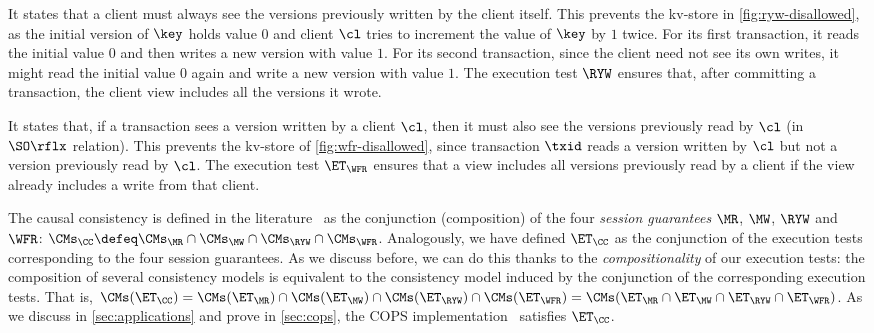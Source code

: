 It states that a client must always see the versions previously written by the client itself.
This prevents the kv-store in \cref{fig:ryw-disallowed}, 
as the initial version of $\key$ holds value $0$ 
and client $\cl$ tries to increment the value of $\key$ by $1$ twice.  
For its first transaction, it reads the initial value $0$ and then writes a new version with value $1$. 
For its second transaction, since the client need not see its own writes, 
it might read the initial value $0$ again and write a new version with value $1$.
The execution test $\RYW$ ensures that, after committing a transaction, 
the client view includes all the versions it wrote.  
 


It states that, if a transaction sees a version written by a
client $\cl$, then it must also see the versions previously read by $\cl$ (in $\SO\rflx$ relation).
This prevents the kv-store of \cref{fig:wfr-disallowed},
since transaction $\txid$ reads a version written by $\cl$ but
not a version previously read by $\cl$.
The execution test $\ET_{\WFR}$ ensures
that a view includes all versions previously read by a client 
if the view already includes a write from that client. 

The causal consistency is defined in the literature~\cite{session2causal} 
as the conjunction (composition) of the four \emph{session guarantees} \(\MR\), \(\MW\), \(\RYW\) and \(\WFR\):   
$\CMs_{\CC} \defeq \CMs_{\MR} \cap \CMs_{\MW} \cap \CMs_{\RYW} \cap \CMs_{\WFR}$. 
Analogously, we have defined $\ET_\CC$ as the conjunction of the execution tests corresponding to the four session guarantees.
As we discuss before, we can do this thanks to the \emph{compositionality} of our execution tests:
the composition of several consistency models is equivalent to the consistency model induced by the conjunction of the corresponding execution tests. 
That is, $\CMs(\ET_\CC) = \CMs(\ET_{\MR}) \cap \CMs(\ET_{\MW}) \cap
\CMs(\ET_{\RYW}) \cap \CMs(\ET_{\WFR}) = \CMs(\ET_{\MR} \cap
\ET_{\MW} \cap \ET_{\RYW} \cap \ET_{\WFR})$.
As we discuss in \cref{sec:applications} and prove in \ref{sec:cops}, the COPS
implementation~\cite{cops} satisfies $\ET_{\CC}$. 

